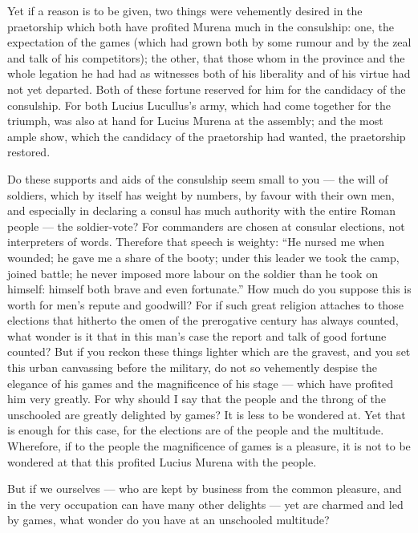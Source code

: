  Yet if a reason is to be given, two things were vehemently desired in the praetorship which both have profited Murena much in the consulship: one, the expectation of the games (which had grown both by some rumour and by the zeal and talk of his competitors); the other, that those whom in the province and the whole legation he had had as witnesses both of his liberality and of his virtue had not yet departed. Both of these fortune reserved for him for the candidacy of the consulship. For both Lucius Lucullus's army, which had come together for the triumph, was also at hand for Lucius Murena at the assembly; and the most ample show, which the candidacy of the praetorship had wanted, the praetorship restored.

 Do these supports and aids of the consulship seem small to you --- the will of soldiers, which by itself has weight by numbers, by favour with their own men, and especially in declaring a consul has much authority with the entire Roman people --- the soldier-vote? For commanders are chosen at consular elections, not interpreters of words. Therefore that speech is weighty: ``He nursed me when wounded; he gave me a share of the booty; under this leader we took the camp, joined battle; he never imposed more labour on the soldier than he took on himself: himself both brave and even fortunate.'' How much do you suppose this is worth for men's repute and goodwill? For if such great religion attaches to those elections that hitherto the omen of the prerogative century has always counted, what wonder is it that in this man's case the report and talk of good fortune counted? But if you reckon these things lighter which are the gravest, and you set this urban canvassing before the military, do not so vehemently despise the elegance of his games and the magnificence of his stage --- which have profited him very greatly. For why should I say that the people and the throng of the unschooled are greatly delighted by games? It is less to be wondered at. Yet that is enough for this case, for the elections are of the people and the multitude. Wherefore, if to the people the magnificence of games is a pleasure, it is not to be wondered at that this profited Lucius Murena with the people.

 But if we ourselves --- who are kept by business from the common pleasure, and in the very occupation can have many other delights --- yet are charmed and led by games, what wonder do you have at an unschooled multitude?

